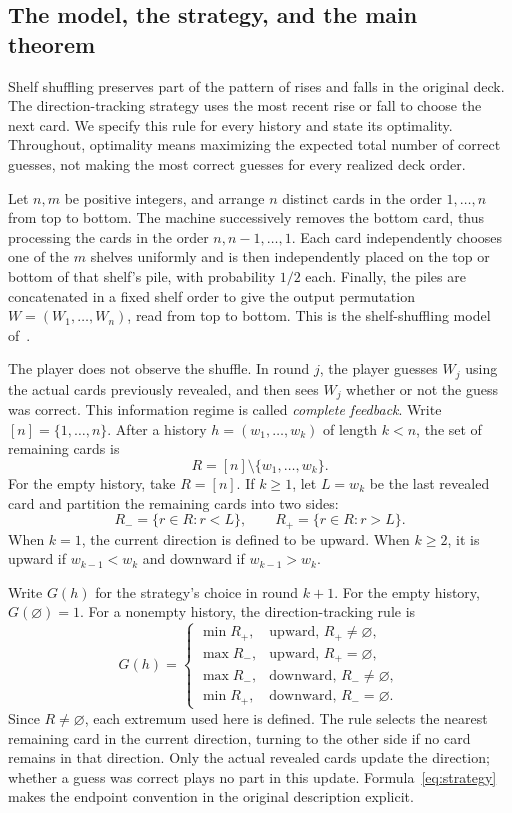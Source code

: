 \documentclass[11pt,reqno]{amsart}
\numberwithin{equation}{section}
\theoremstyle{definition}
\theoremstyle{remark}
\begin{document}
\subsection{The model, the strategy, and the main theorem}\label{sec:model}
Shelf shuffling preserves part of the pattern of rises and falls in the original deck. The direction-tracking strategy uses the most recent rise or fall to choose the next card. We specify this rule for every history and state its optimality. Throughout, optimality means maximizing the expected total number of correct guesses, not making the most correct guesses for every realized deck order.

Let $n,m$ be positive integers, and arrange $n$ distinct cards in the order $1,\ldots,n$ from top to bottom. The machine successively removes the bottom card, thus processing the cards in the order $n,n-1,\ldots,1$. Each card independently chooses one of the $m$ shelves uniformly and is then independently placed on the top or bottom of that shelf's pile, with probability $1/2$ each. Finally, the piles are concatenated in a fixed shelf order to give the output permutation $W=(W_1,\ldots,W_n)$, read from top to bottom. This is the shelf-shuffling model of~\cite[Section 3.1]{DFH}.

The player does not observe the shuffle. In round $j$, the player guesses $W_j$ using the actual cards previously revealed, and then sees $W_j$ whether or not the guess was correct. This information regime is called \emph{complete feedback}. Write $[n]=\{1,\ldots,n\}$. After a history $h=(w_1,\ldots,w_k)$ of length $k<n$, the set of remaining cards is
\[
 R=[n]\setminus\{w_1,\ldots,w_k\}.
\]
For the empty history, take $R=[n]$. If $k\ge1$, let $L=w_k$ be the last revealed card and partition the remaining cards into two sides:
\[
 R_- =\{r\in R:r<L\},\qquad R_+=\{r\in R:r>L\}.
\]
When $k=1$, the current direction is defined to be upward. When $k\ge2$, it is upward if $w_{k-1}<w_k$ and downward if $w_{k-1}>w_k$.

Write $G(h)$ for the strategy's choice in round $k+1$. For the empty history, $G(\varnothing)=1$. For a nonempty history, the direction-tracking rule is
\begin{equation}\label{eq:strategy}
G(h)=
\begin{cases}
\min R_+, & \text{upward, }R_+\ne\varnothing,\\
\max R_-, & \text{upward, }R_+=\varnothing,\\
\max R_-, & \text{downward, }R_-\ne\varnothing,\\
\min R_+, & \text{downward, }R_-=\varnothing.
\end{cases}
\end{equation}
Since $R\ne\varnothing$, each extremum used here is defined. The rule selects the nearest remaining card in the current direction, turning to the other side if no card remains in that direction. Only the actual revealed cards update the direction; whether a guess was correct plays no part in this update. Formula~\eqref{eq:strategy} makes the endpoint convention in the original description explicit.
\end{document}
